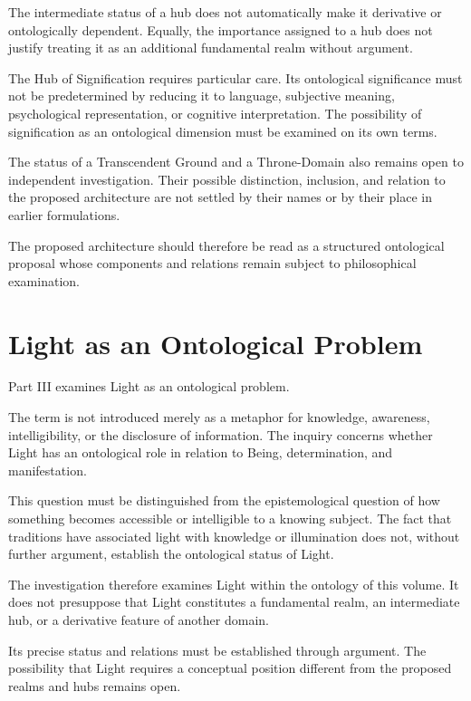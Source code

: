 The intermediate status of a hub does not
automatically make it derivative or
ontologically dependent. Equally, the
importance assigned to a hub does not
justify treating it as an additional
fundamental realm without argument.

The Hub of Signification requires particular
care. Its ontological significance must
not be predetermined by reducing it to
language, subjective meaning, psychological
representation, or cognitive interpretation.
The possibility of signification as an
ontological dimension must be examined
on its own terms.

The status of a Transcendent Ground and
a Throne-Domain also remains open to
independent investigation. Their possible
distinction, inclusion, and relation to
the proposed architecture are not settled
by their names or by their place in
earlier formulations.

The proposed architecture should therefore
be read as a structured ontological proposal
whose components and relations remain
subject to philosophical examination.



\section*{Light as an Ontological Problem}

Part III examines Light as an ontological
problem.

The term is not introduced merely as a
metaphor for knowledge, awareness,
intelligibility, or the disclosure of
information. The inquiry concerns whether
Light has an ontological role in relation
to Being, determination, and manifestation.

This question must be distinguished from
the epistemological question of how something
becomes accessible or intelligible to a
knowing subject. The fact that traditions
have associated light with knowledge or
illumination does not, without further
argument, establish the ontological status
of Light.

The investigation therefore examines Light
within the ontology of this volume. It
does not presuppose that Light constitutes
a fundamental realm, an intermediate hub,
or a derivative feature of another domain.

Its precise status and relations must be
established through argument. The possibility
that Light requires a conceptual position
different from the proposed realms and hubs
remains open.

